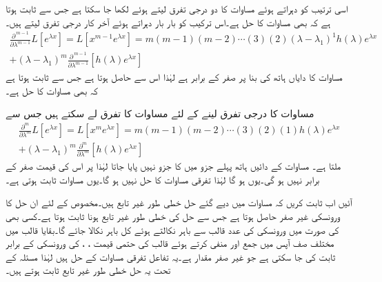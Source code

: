 اسی ترتیب کو دہراتے ہوئے مساوات  کا دو درجی تفرق لیتے ہوئے  لکھا جا سکتا ہے جس سے ثابت ہوتا ہے کہ  بھی مساوات  کا حل ہے۔اس ترکیب کو بار بار دہراتے ہوئے آخر کار  درجی تفرق لیتے ہیں۔
\begin{multline}\label{مساوات_سادہ_بلند_متعدد_گنا_جذر_ٹ}
\frac{\partial^{\, m-1} }{\partial \lambda^{m-1}} L[e^{\lambda x}]=L[x^{m-1}e^{\lambda x}]=m(m-1)(m-2)\cdots (3)(2)(\lambda-\lambda_1)^{1}h(\lambda)e^{\lambda x}\\
+(\lambda-\lambda_1)^m \frac{\partial^{\, m-1}}{\partial \lambda^{m-1}}[h(\lambda)e^{\lambda x}]
\end{multline}
مساوات کا دایاں ہاتھ  کی بنا  پر صفر کے برابر ہے لہٰذا اس سے  حاصل ہوتا ہے جس سے ثابت ہوتا ہے کہ  بھی مساوات  کا حل ہے۔

مساوات  کا  درجی تفرق لینے کے لئے مساوات  کا تفرق لے سکتے ہیں جس سے
\begin{multline*}
\frac{\partial^m }{\partial \lambda^m} L[e^{\lambda x}]=L[x^me^{\lambda x}]=m(m-1)(m-2)\cdots (3)(2)(1)h(\lambda)e^{\lambda x}\\
+(\lambda-\lambda_1)^m \frac{\partial^m}{\partial \lambda^m}[h(\lambda)e^{\lambda x}]
\end{multline*}
ملتا ہے۔ مساوات کے دائیں ہاتھ پہلے جزو میں  کا جزو نہیں پایا جاتا لہٰذا  پر اس کی قیمت صفر کے برابر نہیں ہو گی۔یوں  ہو گا لہٰذا  تفرقی مساوات  کا حل نہیں ہو گا۔یوں مساوات  ثابت ہوتی ہے۔

آئیں اب ثابت کریں کہ مساوات  میں دیے گئے حل خطی طور غیر تابع ہیں۔مخصوص  کے لئے ان حل کا ورونسکی غیر صفر حاصل ہوتا ہے جس سے حل کی خطی طور غیر تابع ہونا ثابت ہوتا ہے۔کسی بھی  کی صورت میں ورونسکی کی  عدد  قالب سے  باہر نکالتے ہوئے  کل  باہر نکالا جائے گا۔بقایا قالب میں مختلف صف آپس میں جمع اور منفی کرتے ہوئے قالب کی حتمی قیمت  ، ،   کی ورونسکی کے برابر ثابت کی جا سکتی ہے جو غیر صفر مقدار ہے۔یہ تفاعل تفرقی مساوات  کے حل ہیں لہٰذا مسئلہ  کے تحت یہ حل خطی طور غیر تابع ثابت ہوتے ہیں۔

